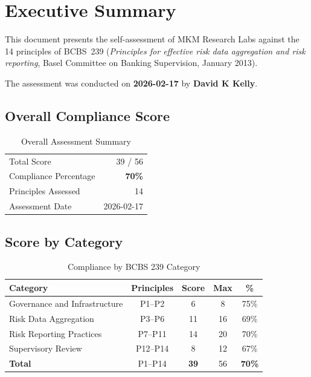 \documentclass[11pt]{article}
\begin{document}
\mkmtitlepage
\mkmlegalpage
\tableofcontents
\clearpage

\section{Executive Summary}

This document presents the self-assessment of MKM Research Labs against the
14 principles of BCBS~239 (\textit{Principles for effective risk data aggregation
and risk reporting}, Basel Committee on Banking Supervision, January 2013).

The assessment was conducted on \textbf{2026-02-17} by
\textbf{David K Kelly}.

\subsection{Overall Compliance Score}

\begin{table}[H]
    \centering
    \caption{Overall Assessment Summary}
    \begin{tabular}{lr}
        \toprule
        Total Score & 39 / 56 \\
        Compliance Percentage & \textbf{70\%} \\
        Principles Assessed & 14 \\
        Assessment Date & 2026-02-17 \\
        \bottomrule
    \end{tabular}
\end{table}

\subsection{Score by Category}

\begin{table}[H]
    \centering
    \caption{Compliance by BCBS 239 Category}
    \label{tab:category_scores}
    \begin{tabular}{lcccc}
        \toprule
        \textbf{Category} & \textbf{Principles} & \textbf{Score} & \textbf{Max} & \textbf{\%} \\
        \midrule
        Governance and Infrastructure & P1--P2 & 6 & 8 & 75\% \\
        Risk Data Aggregation & P3--P6 & 11 & 16 & 69\% \\
        Risk Reporting Practices & P7--P11 & 14 & 20 & 70\% \\
        Supervisory Review & P12--P14 & 8 & 12 & 67\% \\
        \midrule
        \textbf{Total} & P1--P14 & \textbf{39} & 56 & \textbf{70\%} \\
        \bottomrule
    \end{tabular}
\end{table}
\end{document}
